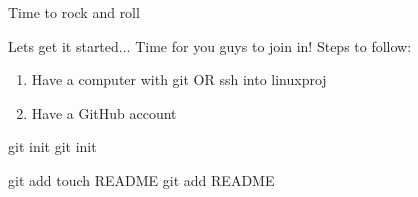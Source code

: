 \documentclass{beamer}
\begin{document}
\begin{frame}{Time to rock and roll}
\begin{block}{Lets get it started...}
Time for you guys to join in!
Steps to follow:
\begin{enumerate}
\item  Have a computer with git OR ssh into linuxproj
\item Have a GitHub account
\end{enumerate}
\end{block}
\end{frame}
\begin{frame}{git init}
git init
\end{frame}

\begin{frame}{git add}
touch README
git add README
\end{frame}
\end{document}
